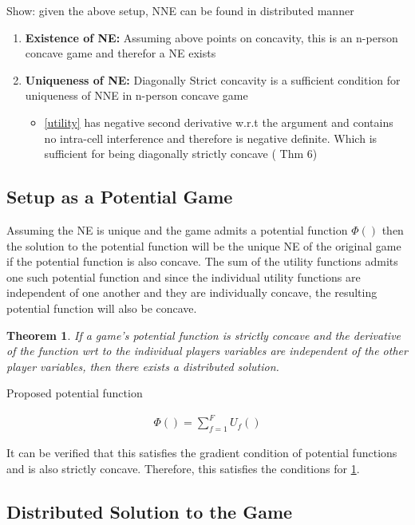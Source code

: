 \documentclass[12pt]{article}
\newtheorem{theorem}{Theorem}
\begin{document}
Show: given the above setup, NNE can be found in distributed manner


\begin{enumerate}
\item \textbf{Existence of NE:} Assuming above points on concavity, this is an n-person concave game and therefor a NE exists
\item \textbf{Uniqueness of NE:} Diagonally Strict concavity is a sufficient condition for uniqueness of NNE in n-person concave game
\begin{itemize}
\item\eqref{utility} has negative second derivative w.r.t the argument and contains no intra-cell interference and therefore is negative definite. Which is sufficient for being diagonally strictly concave
\cite[Thm6]{rosen1964existence} ( Thm 6)

\end{itemize}

\end{enumerate}

\subsection{Setup as a Potential Game}
Assuming the NE is unique and the game admits a potential function $\Phi()$ then the solution to the potential function will be the unique NE of the original game if the potential function is also concave. 
The sum of the utility functions admits one such potential function and since the individual utility functions are independent of one another and they are individually concave, the resulting potential function will also be concave. 
\\
\begin{theorem}\label{distributed}
If a game's potential function is strictly concave and the derivative of the function wrt to the individual players variables are independent of the other player variables, then there exists a distributed solution.
\end{theorem}


Proposed potential function

\begin{gather*} 
\Phi() = \sum_{f = 1}^{F} U_f() 
\end{gather*}


It can be verified that this satisfies the gradient condition of potential functions and is also strictly concave. Therefore, this satisfies the conditions for \ref{distributed}.



\subsection{Distributed Solution to the Game}
\end{document}
